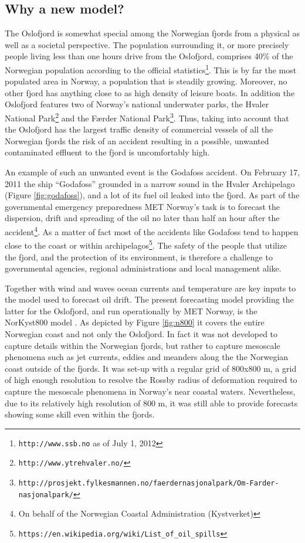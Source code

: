 \subsection{Why a new model?}
The Oslofjord is somewhat special among the Norwegian fjords from a physical as well as a societal perspective. The population surrounding it, or more precisely people living less than one hours drive from the Oslofjord, comprises 40\% of the Norwegian population according to the official statistics\footnote{\texttt{http://www.ssb.no} as of July 1, 2012}. This is by far the most populated area in Norway, a population that is steadily growing. Moreover, no other fjord has anything close to as high density of leisure boats. In addition the Oslofjord features two of Norway's national underwater parks, the Hvaler National Park\footnote{\texttt{http://www.ytrehvaler.no/}} and the F{\ae}rder National Park\footnote{\texttt{http://prosjekt.fylkesmannen.no/faerdernasjonalpark/Om-Farder-nasjonalpark/}}. Thus, taking into account that the Oslofjord has the largest traffic density of commercial vessels of all the Norwegian fjords the risk of an accident resulting in a possible, unwanted contaminated effluent to the fjord is uncomfortably high. 
 

An example of such an unwanted event is the Godafoss accident. On February 17, 2011 the ship ``Godafoss'' grounded in a narrow sound in the Hvaler Archipelago (Figure \ref{fig:godafoss}), and a lot of its fuel oil leaked into the fjord. As part of the governmental emergency preparedness MET Norway's task is to forecast the dispersion, drift and spreading of the oil no later than half an hour after the accident\footnote{On behalf of the Norwegian Coastal Administration (Kystverket)}. As a matter of fact most of the accidents like Godafoss tend to happen close to the coast or within archipelagos\footnote{\texttt{https://en.wikipedia.org/wiki/List\_of\_oil\_spills}}. The safety of the people that utilize the fjord, and the protection of its environment, is therefore a challenge to governmental agencies, regional administrations and local management alike. 

Together with wind and waves ocean currents and temperature are key inputs to the model used to forecast oil drift. The present forecasting model providing the latter for the Oslofjord, and run operationally by MET Norway, is the NorKyst800 model \citep{albre:etal:2011}. As depicted by Figure \ref{fig:n800} it covers the entire Norwegian coast and not only the Oslofjord. In fact it was not developed to capture details within the Norwegian fjords, but rather to capture mesoscale phenomena such as jet currents, eddies and meanders along the the Norwegian coast outside of the fjords. It was set-up with a regular grid of 800x800 m, a grid of high  enough resolution to resolve the Rossby radius of deformation required to capture the mesoscale phenomena in Norway's near coastal waters. Nevertheless, due to its relatively high resolution of 800 m, it was still able to provide forecasts showing some skill even within the fjords.


